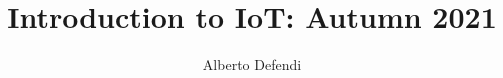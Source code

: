 \documentclass[acmsmall, screen,timestamp,nonacm]{acmart}
\begin{document}
\title{Introduction to IoT: Autumn 2021}

\author{Alberto Defendi}

\renewcommand{\shortauthors}{Alberto Defendi}

%
\maketitle
\end{document}
